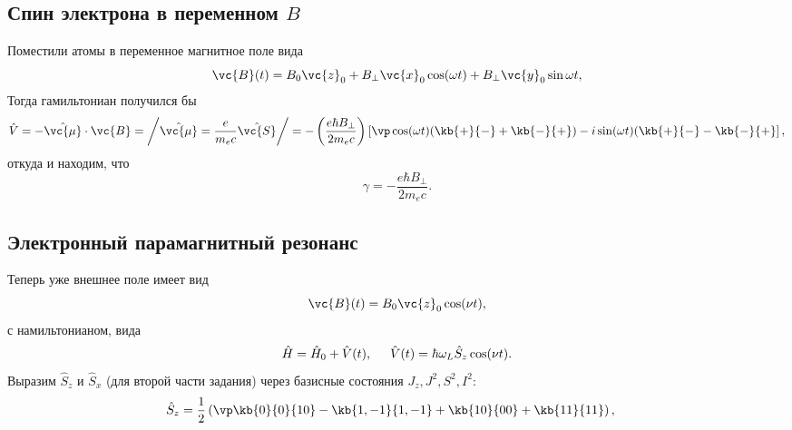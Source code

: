 \setcounter{section}{1}

\subsection{Спин электрона в переменном \texorpdfstring{$B$}{B}}

Поместили атомы в переменное магнитное поле вида
\begin{equation*}
    \vc{B}(t) = B_0 \vc{z}_0 + B_\bot \vc{x}_0 \cos (\omega t) + B_\bot \vc{y}_0 \sin \omega t,
\end{equation*}
Тогда гамильтониан получился бы
\begin{equation*}
    \hat{V} = - \hat{\vc{\mu}} \cdot \vc{B} = \bigg/
    \hat{\vc{\mu}} = \frac{e}{m_e c} \hat{\vc{S}} \bigg/
    = -  \left(\frac{e \hbar B_\bot}{2 m_e c}\right) \left[ \vp
        \cos (\omega t) (\kb{+}{-}  + \kb{-}{+})
        - i \sin (\omega t) (\kb{+}{-} - \kb{-}{+}
    \right],
\end{equation*}
откуда и находим, что
\begin{equation*}
    \gamma = - \frac{e \hbar B_\bot}{2 m_e c}.
\end{equation*}







\subsection{Электронный парамагнитный резонанс}

Теперь уже внешнее поле имеет вид
\begin{equation*}
    \vc{B}(t) = B_0 \vc{z}_0 \cos(\nu t),
\end{equation*}
с намильтонианом, вида
\begin{equation*}
    \hat{H} = \hat{H}_0  + \hat{V}(t),
    \hspace{5 mm} 
    \hat{V}(t) = \hbar \omega_L \hat{S}_z \cos (\nu t).
\end{equation*}
Выразим $\hat{S}_z$ и $\hat{S}_x$ (для второй части задания) через базисные состояния $J_z, J^2, S^2, I^2$:
\begin{align*}
    \hat{S}_z &= \frac{1}{2} \left(\vp 
        \kb{0}{0}{10} - \kb{1,-1}{1,-1} + \kb{10}{00} + \kb{11}{11}
    \right),
\end{align*}




